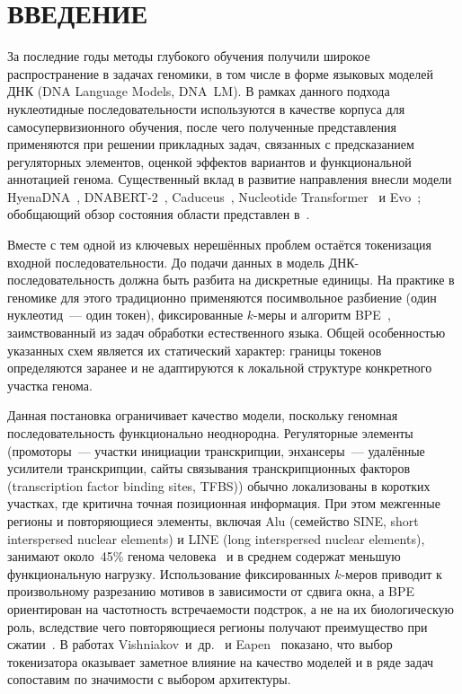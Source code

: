 \chapter*{ВВЕДЕНИЕ}
\sloppy

За последние годы методы глубокого обучения получили широкое
распространение в задачах геномики, в том числе в форме языковых
моделей ДНК (DNA Language Models, DNA~LM). В рамках данного подхода
нуклеотидные последовательности используются в качестве корпуса для
самосупервизионного обучения, после чего полученные представления
применяются при решении прикладных задач, связанных с предсказанием
регуляторных элементов, оценкой эффектов вариантов и функциональной
аннотацией генома. Существенный вклад в развитие направления внесли
модели HyenaDNA~\cite{nguenHyenaDNALongRangeGenomic2024},
DNABERT-2~\cite{zhouDNABERT2EfficientFoundation2024},
Caduceus~\cite{schiffCaduceusBiDirectionalEquivariant2024},
Nucleotide
Transformer~\cite{dalla-torreNucleotideTransformerBuilding2025} и
Evo~\cite{nguyenSequenceModelingDesign2024}; обобщающий обзор
состояния области представлен в~\cite{benegasGenomicLanguageModels2024}.

Вместе с тем одной из ключевых нерешённых проблем остаётся
токенизация входной последовательности. До подачи данных в модель
ДНК-последовательность должна быть разбита на дискретные единицы. На
практике в геномике для этого традиционно применяются посимвольное
разбиение (один нуклеотид~--- один токен), фиксированные $k$-меры и
алгоритм BPE~\cite{sennrichNeuralMachineTranslation2016},
заимствованный из задач обработки естественного языка. Общей
особенностью указанных схем является их статический характер: границы
токенов определяются заранее и не адаптируются к локальной структуре
конкретного участка генома.

Данная постановка ограничивает качество модели, поскольку геномная
последовательность функционально неоднородна. Регуляторные элементы
(промоторы~--- участки инициации транскрипции, энхансеры~---
  удалённые усилители транскрипции, сайты связывания транскрипционных
факторов (transcription factor binding sites, TFBS)) обычно
локализованы в коротких участках, где критична точная позиционная
информация. При этом межгенные регионы и повторяющиеся элементы,
включая Alu (семейство SINE, short interspersed nuclear elements) и
LINE (long interspersed nuclear elements), занимают около~45\% генома
человека~\cite{landerInitialSequencingAnalysis2001} и в среднем
содержат меньшую функциональную нагрузку. Использование фиксированных
$k$-меров приводит к произвольному разрезанию мотивов в зависимости
от сдвига окна, а BPE ориентирован на частотность встречаемости
подстрок, а не на их биологическую роль, вследствие чего
повторяющиеся регионы получают преимущество при
сжатии~\cite{lindseyImpactTokenizerSelection2025}. В работах
Vishniakov~и~др.~\cite{vishniakovGenomicFoundationlessModels2024} и
Eapen~\cite{eapenGenomicTokenizerBiologydriven2025} показано, что
выбор токенизатора оказывает заметное влияние на качество моделей и в
ряде задач сопоставим по значимости с выбором архитектуры.


